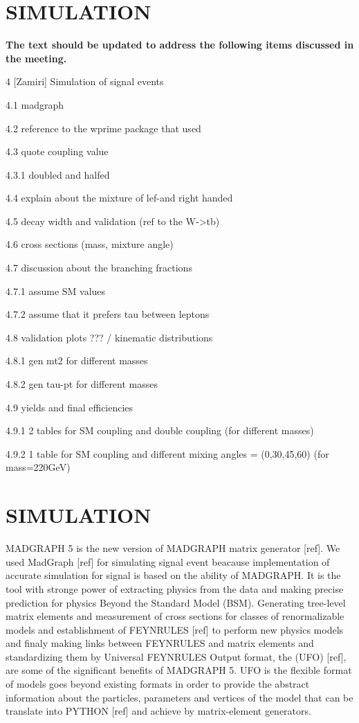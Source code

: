 \section{SIMULATION}\label{sec:evo}

{\bf The text should be updated to address the following items discussed in the meeting.}

4 [Zamiri] Simulation of signal events

4.1 madgraph

4.2 reference to the wprime package that used

4.3 quote coupling value

4.3.1 doubled and halfed

4.4 explain about the mixture of lef-and right handed

4.5 decay width and validation (ref to the W->tb)

4.6 cross sections (mass, mixture angle)

4.7 discussion about the branching fractions

4.7.1 assume SM values

4.7.2 assume that it prefers tau between leptons

4.8 validation plots ??? / kinematic distributions

4.8.1 gen mt2 for different masses

4.8.2 gen tau-pt for different masses

4.9 yields and final efficiencies

4.9.1 2 tables for SM coupling and double coupling (for different masses)

4.9.2 1 table for SM coupling and different mixing angles = (0,30,45,60) (for mass=220GeV)

\section{SIMULATION}\label{sec:evo}
  {\small MADGRAPH 5} is the new version of {\small MADGRAPH} matrix generator [ref]. We used MadGraph [ref] for simulating signal event beacause implementation of accurate simulation for signal is based on the ability of {\small MADGRAPH}. It is the tool with stronge power of extracting physics from the data and making precise prediction for physics Beyond the Standard Model {\small (BSM)}. Generating tree-level matrix elements and measurement of cross sections for classes of renormalizable models and establishment of {\small FEYNRULES} [ref] to perform new physics models and finaly making links between {\small FEYNRULES} and matrix elements and standardizing them by Universal F{\small EYNRULES} Output format, the {\small (UFO)} [ref], are some of the significant benefits of {\small MADGRAPH 5}. {\small UFO} is the flexible format of models goes beyond existing formats in order to provide the abstract information about the particles, parameters and vertices of the model that can be translate into {\small PYTHON} [ref] and achieve by matrix-element generators. 
 
